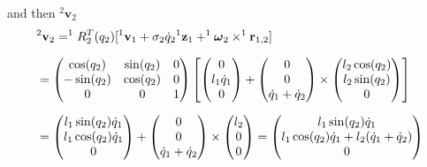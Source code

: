 \documentclass[10pt, a4paper]{report}
\begin{document}
and then ${}^2\mathbf v_{2}$\begin{align}
    &{}^2\mathbf v_2=^{1}R^T_2(q_2)[
         {}^{1}\mathbf v_{1}+\sigma_2\dot q_2 {}^{1}\mathbf z_{1}+
         ^{1}{\boldsymbol{\omega}}_{2}\times ^{1}\mathbf r_{1,2}
    ]\\[1.5ex] 
    &=\begin{pmatrix}
        \cos(q_2)&\sin(q_2)&0\\ 
        -\sin(q_2)&\cos(q_2)&0\\ 
        0&0&1
    \end{pmatrix}
    \left[
        \begin{pmatrix}
           0\\l_1\dot q_1\\ 0
        \end{pmatrix}+\begin{pmatrix}
            0\\0\\\dot q_1+\dot q_2
        \end{pmatrix}\times \begin{pmatrix}
            l_2\cos( q_2)\\ 
            l_2\sin (q_2)\\ 0
        \end{pmatrix}
    \right]\\[1.5ex]
    &=\begin{pmatrix}
        l_1\sin(q_2)\dot q_1\\l_1\cos(q_2)\dot q_1\\0
    \end{pmatrix}+\begin{pmatrix}
        0\\0\\\dot q_1+\dot q_2
    \end{pmatrix}\times \begin{pmatrix}
        l_2\\0\\0
    \end{pmatrix}=\begin{pmatrix}
        l_1\sin (q_2)\dot q_1\\l_1\cos(q_2)\dot q_1 + l_2(\dot q_1+\dot q_2)
        \\0
    \end{pmatrix}
\end{align}
\end{document}
